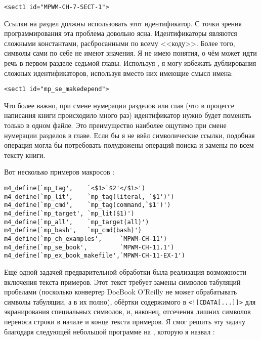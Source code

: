 \begin{verbatim}
<sect1 id="MPWM-CH-7-SECT-1">
\end{verbatim}

Ссылки на раздел должны использовать этот идентификатор. С точки
зрения программирования эта проблема довольно ясна. Идентификаторы
являются сложными константами, расбросанными по всему <<коду>>. Более
того, символы сами по себе не имеют значения. Я не имею понятия, о чём
может идти речь в первом разделе седьмой главы. Используя
, я могу избежать дублирования сложных идентификаторов,
используя вместо них имеющие смысл имена:

\begin{verbatim}
<sect1 id="mp_se_makedepend">
\end{verbatim}

Что более важно, при смене нумерации разделов или глав (что в процессе
написания книги происходило много раз) идентификатор нужно будет
поменять только в одном файле. Это преимущество наиболее ощутимо при
смене нумерации разделов в главе. Если бы я не ввёл символические
ссылки, подобная операция могла бы потребовать полудюжены операций
поиска и замены по всем тексту книги.

Вот несколько примеров макросов :
\begin{verbatim}
m4_define(`mp_tag',    `<$1>`$2'</$1>')
m4_define(`mp_lit',    `mp_tag(literal, `$1')')
m4_define(`mp_cmd',    `mp_tag(command,`$1')')
m4_define(`mp_target', `mp_lit($1)')
m4_define(`mp_all',    `mp_target(all)')
m4_define(`mp_bash',   `mp_cmd(bash)')
m4_define(`mp_ch_examples',     `MPWM-CH-11')
m4_define(`mp_se_book',         `MPWM-CH-11.1')
m4_define(`mp_ex_book_makefile',`MPWM-CH-11-EX-1')
\end{verbatim}

Ещё одной задачей предварительной обработки была реализация
возможности включения текста примеров. Этот текст требует замены
символов табуляций пробелами (посколько конвертер DocBook O'Reilly не
может обрабатывать символы табуляции, а в  их полно),
обёртки содержимого в \verb|<![CDATA[...]]>| для экранирования
специальных символов, и, наконец, отсечения лишних символов переноса
строки в начале и конце текста примеров. Я смог решить эту задачу
благодаря следующей небольшой программе на , которую я
назвал :

